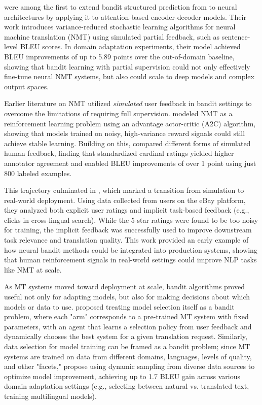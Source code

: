 \documentclass[11pt]{article}
\begin{document}
\citet{kreutzer-etal-2017-bandit} were among the first to extend bandit structured prediction from \citet{sokolov-etal-2016-learning} to neural architectures by applying it to attention-based encoder-decoder models. Their work introduces variance-reduced stochastic learning algorithms for neural machine translation (NMT) using simulated partial feedback, such as sentence-level BLEU scores. In domain adaptation experiments, their model achieved BLEU improvements of up to 5.89 points over the out-of-domain baseline, showing that bandit learning with partial supervision could not only effectively fine-tune neural NMT systems, but also could scale to deep models and complex output spaces.

Earlier literature on NMT utilized \textit{simulated} user feedback in bandit settings to overcome the limitations of requiring full supervision. \citet{nguyen-etal-2017-reinforcement} modeled NMT as a reinforcement learning problem using an advantage actor-critic (A2C) algorithm, showing that models trained on noisy, high-variance reward signals could still achieve stable learning. Building on this, \citet{kreutzer-etal-2018-reliability} compared different forms of simulated human feedback, finding that standardized cardinal ratings yielded higher annotator agreement and enabled BLEU improvements of over 1 point using just 800 labeled examples.

This trajectory culminated in \citet{kreutzer-etal-2018-neural}, which marked a transition from simulation to real-world deployment. Using data collected from users on the eBay platform, they analyzed both explicit user ratings and implicit task-based feedback (e.g., clicks in cross-lingual search). While the 5-star ratings were found to be too noisy for training, the implicit feedback was successfully used to improve downstream task relevance and translation quality. This work provided an early example of how neural bandit methods could be integrated into production systems, showing that human reinforcement signals in real-world settings could improve NLP tasks like NMT at scale.

As MT systems moved toward deployment at scale, bandit algorithms proved useful not only for adapting models, but also for making decisions about which models or data to use. \citet{naradowsky-etal-2020-machine} proposed treating model selection itself as a bandit problem, where each "arm" corresponds to a pre-trained MT system with fixed parameters, with an agent that learns a selection policy from user feedback and dynamically chooses the best system for a given translation request. Similarly, data selection for model training can be framed as a bandit problem; since MT systems are trained on data from different domains, languages, levels of quality, and other "facets," \citet{bandits-dont-follow-rules-kreutzer-etal-2021} propose using dynamic sampling from diverse data sources to optimize model improvement, achieving up to 1.7 BLEU gain across various domain adaptation settings (e.g., selecting between natural vs. translated text, training multilingual models).
\end{document}
